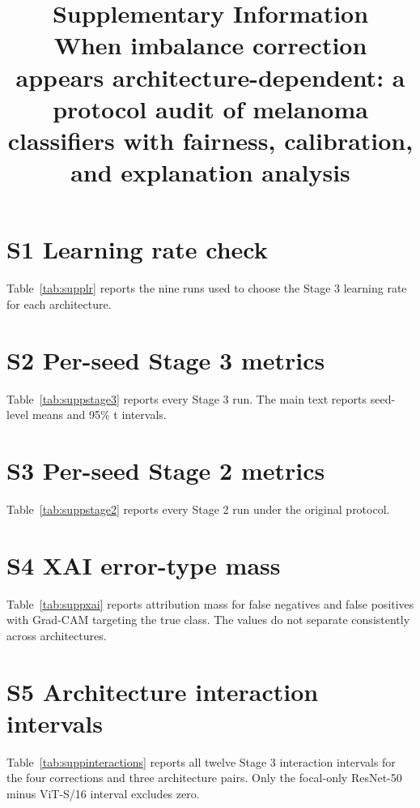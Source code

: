 \documentclass[11pt]{article}
\title{Supplementary Information\\[0.3em]
\large When imbalance correction appears architecture-dependent: a protocol audit of melanoma classifiers with fairness, calibration, and explanation analysis}
\author{}
\date{}
\begin{document}
\maketitle

\section*{S1 Learning rate check}

Table~\ref{tab:supplr} reports the nine runs used to choose the Stage 3 learning rate for each architecture.



\section*{S2 Per-seed Stage 3 metrics}

Table~\ref{tab:suppstage3} reports every Stage 3 run. The main text reports seed-level means and 95\% t intervals.



\section*{S3 Per-seed Stage 2 metrics}

Table~\ref{tab:suppstage2} reports every Stage 2 run under the original protocol.



\section*{S4 XAI error-type mass}

Table~\ref{tab:suppxai} reports attribution mass for false negatives and false positives with Grad-CAM targeting the true class. The values do not separate consistently across architectures.



\section*{S5 Architecture interaction intervals}

Table~\ref{tab:suppinteractions} reports all twelve Stage 3 interaction intervals for the four corrections and three architecture pairs. Only the focal-only ResNet-50 minus ViT-S/16 interval excludes zero.
\end{document}
